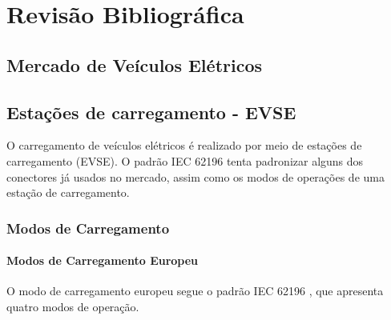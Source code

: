 \chapter{Revisão Bibliográfica}

\section{Mercado de Veículos Elétricos}

\section{Estações de carregamento - EVSE}

O carregamento de veículos elétricos é realizado por meio de estações de carregamento (EVSE). O padrão IEC 62196 \cite{iec-62196} tenta padronizar alguns dos conectores já usados no mercado, assim como os modos de operações de uma estação de carregamento.

\subsection{Modos de Carregamento}

\subsubsection{Modos de Carregamento Europeu}

O modo de carregamento europeu segue o padrão IEC 62196 \cite{iec-62196}, que apresenta quatro modos de operação.

